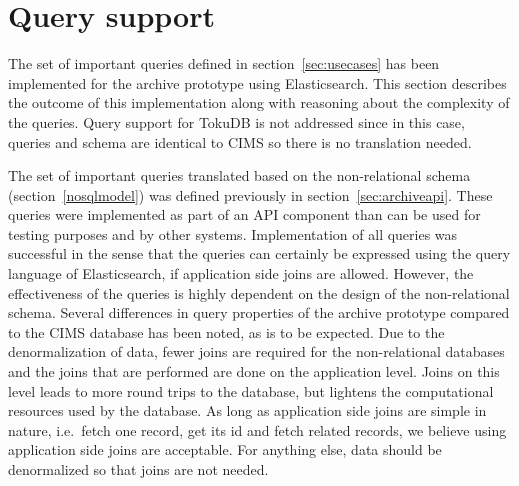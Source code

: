 
\section{Query support}

The set of important queries defined in section~\ref{sec:usecases} has been implemented for the archive prototype using Elasticsearch. This section describes the outcome of this implementation along with reasoning about the complexity of the queries. Query support for TokuDB is not addressed since in this case, queries and schema are identical to CIMS so there is no translation needed.

The set of important queries translated based on the non-relational schema (section~\ref{nosqlmodel}) was defined previously in section~\ref{sec:archiveapi}. These queries were implemented as part of an API component than can be used for testing purposes and by other systems. Implementation of all queries was successful in the sense that the queries can certainly be expressed using the query language of Elasticsearch, if application side joins are allowed. However, the effectiveness of the queries is highly dependent on the design of the non-relational schema. Several differences in query properties of the archive prototype compared to the CIMS database has been noted, as is to be expected. Due to the denormalization of data, fewer joins are required for the non-relational databases and the joins that are performed are done on the application level. Joins on this level leads to more round trips to the database, but lightens the computational resources used by the database. As long as application side joins are simple in nature, i.e.\ fetch one record, get its id and fetch related records, we believe using application side joins are acceptable. For anything else, data should be denormalized so that joins are not needed.



%

